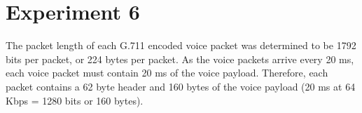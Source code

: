\section*{Experiment 6}

The packet length of each G.711 encoded voice packet was determined to be 1792 bits per packet, or 224 bytes per packet. As the voice packets arrive every 20 ms, each voice packet must contain 20 ms of the voice payload. Therefore, each packet contains a 62 byte header and 160 bytes of the voice payload (20 ms at 64 Kbps = 1280 bits or 160 bytes).